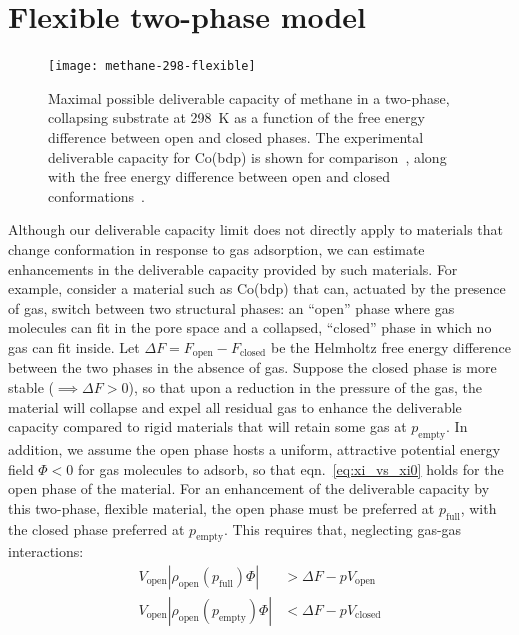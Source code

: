 \documentclass[twoside,twocolumn,9pt]{article}
\newcommand\V{\Phi}
\newcommand\pfull{\ensuremath{p_{\text{full}}}}
\newcommand\pempty{\ensuremath{p_{\text{empty}}}}
\begin{document}
\section{Flexible two-phase model}
\begin{figure}
    \centering
    \texttt{[image: methane-298-flexible]}
    \caption{Maximal possible deliverable capacity of methane in a two-phase, collapsing substrate at 298\ K as a function of the free energy difference 
      between open and closed phases. The experimental deliverable capacity for Co(bdp) is shown for
       comparison~\cite{mason2015methane}, along with the free energy difference between open and closed conformations~\cite{mason2015methane, choi2008broadly}.}
    \label{fig:methane-flexible}
\end{figure}
Although our deliverable capacity limit does not directly apply to materials that change conformation in
response to gas adsorption, we can estimate enhancements in the deliverable capacity provided by
such materials. 
For example, consider a material such as Co(bdp) \cite{mason2015methane} that 
can, actuated by the presence of gas, switch between two structural phases: 
an ``open'' phase where gas molecules can fit in the pore space and a 
collapsed, ``closed'' phase in which no gas can fit inside.
Let $\Delta F=F_{\text{open}}-F_{\text{closed}}$ be the Helmholtz free
energy difference between the two phases in the absence of gas.
Suppose the closed phase is more stable ($\implies \Delta F >0$), so that upon a reduction in the pressure of the gas, the material will collapse and expel all residual gas to enhance the deliverable capacity compared to rigid materials that will retain some gas at $\pempty$. 
In addition, we assume the open phase hosts a uniform, attractive potential energy field $\V<0$ for gas molecules to adsorb, so that eqn.~\ref{eq:xi_vs_xi0} holds for the open phase of the material.
For an enhancement of the deliverable capacity by this two-phase, flexible material, 
the open phase must be preferred at $\pfull$, with the closed phase preferred at $\pempty$. 
This requires that, neglecting gas-gas interactions:
\begin{align}
    V_{\text{open}}|\rho_{\text{open}}(\pfull)\V| &> \Delta F -pV_{\text{open}} \\
    V_{\text{open}}|\rho_{\text{open}}(\pempty)\V| &< \Delta F -pV_{\text{closed}}
\end{align}
\end{document}
